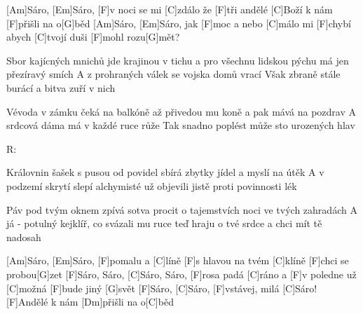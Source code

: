 
[Am]Sáro, [Em]Sáro, [F]v noci se mi [C]zdálo 
že [F]tři andělé [C]Boží k nám [F]přišli na o[G]běd 
[Am]Sáro, [Em]Sáro, jak [F]moc a nebo [C]málo 
mi [F]chybí abych [C]tvojí duši [F]mohl rozu[G]mět? 

Sbor kajícných mnichů jde krajinou v tichu 
a pro všechnu lidskou pýchu 
má jen přezíravý smích 
A z prohraných válek se vojska domů vrací 
Však zbraně stále burácí 
a bitva zuří v nich 

Vévoda v zámku čeká na balkóně 
až přivedou mu koně 
a pak mává na pozdrav 
A srdcová dáma má v každé ruce růže 
Tak snadno poplést může 
sto urozených hlav 

R:

Královnin šašek s pusou od povidel 
sbírá zbytky jídel 
a myslí na útěk 
A v podzemí skrytí slepí alchymisté 
už objevili jistě 
proti povinnosti lék 

Páv pod tvým oknem zpívá sotva procit 
o tajemstvích noci 
ve tvých zahradách 
A já - potulný kejklíř, co svázali mu ruce 
teď hraju o tvé srdce 
a chci mít tě nadosah 

[Am]Sáro, [Em]Sáro, [F]pomalu a [C]líně 
[F]s hlavou na tvém [C]klíně [F]chci se probou[G]zet 
[F]Sáro, Sáro, [C]Sáro, Sáro, [F]rosa padá [C]ráno 
a [F]v poledne už [C]možná [F]bude jiný [G]svět 
[F]Sáro, [C]Sáro, [F]vstávej, milá [C]Sáro! 
[F]Andělé k nám [Dm]přišli na o[C]běd
